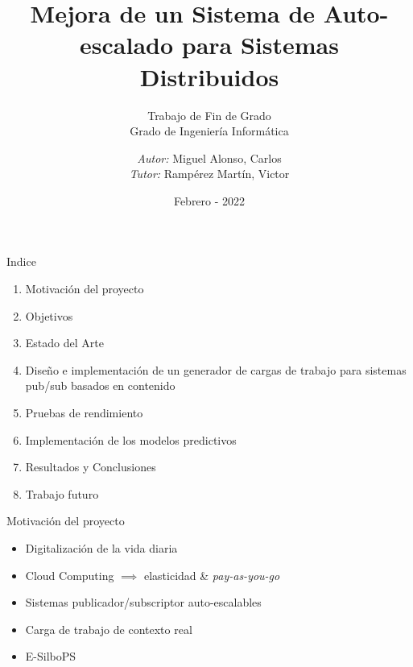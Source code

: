 \documentclass[12pt, spanish]{beamer}
\title{Mejora de un Sistema de Auto-escalado para Sistemas Distribuidos}
\subtitle{Trabajo de Fin de Grado\\{\small Grado de Ingeniería Informática}}
\author[CMA]{\textit{Autor:} Miguel Alonso, Carlos\\\textit{Tutor:} Rampérez Martín, Victor}
\institute{ETSIINF - Universidad Politécnica de Madrid}
\date{Febrero - 2022}
\begin{document}

\begin{frame}%
    \titlepage
\end{frame}


\begin{frame}{Indice}
    \begin{enumerate}
        \item Motivación del proyecto\vspace{0.1cm}
        \item Objetivos\vspace{0.1cm}
        \item Estado del Arte\vspace{0.1cm}
        \item Diseño e implementación de un generador de cargas de trabajo para sistemas pub/sub basados en contenido\vspace{0.1cm}
        \item Pruebas de rendimiento\vspace{0.1cm}
        \item Implementación de los modelos predictivos\vspace{0.1cm}
        \item Resultados y Conclusiones\vspace{0.1cm}
        \item Trabajo futuro
    \end{enumerate}
\end{frame}


\begin{frame}{Motivación del proyecto}
    \begin{itemize}
        \item Digitalización de la vida diaria\vspace{0.1cm}
        \item Cloud Computing $\implies$ elasticidad \& \textit{pay-as-you-go}\vspace{0.1cm}
        \item Sistemas publicador/subscriptor auto-escalables\vspace{0.1cm}
        \item Carga de trabajo de contexto real\vspace{0.1cm}
        \item E-SilboPS
    \end{itemize}
\end{frame}
\end{document}
